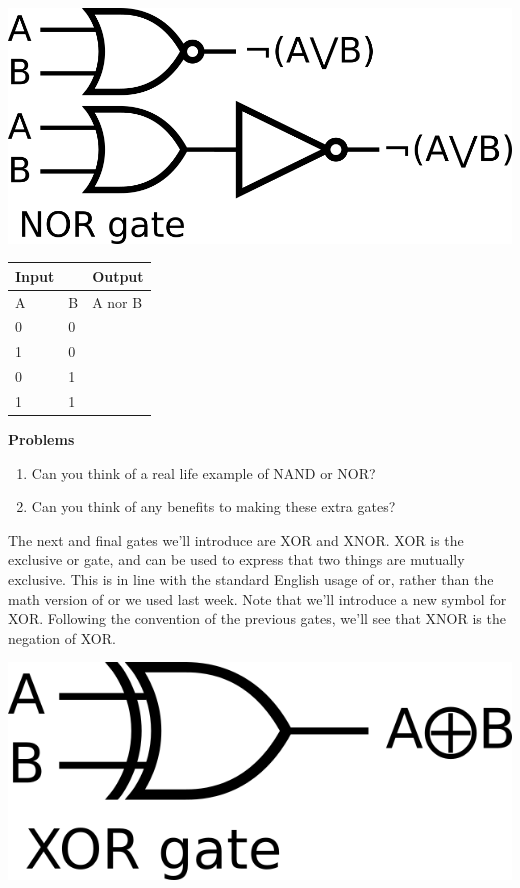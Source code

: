 \begin{minipage}{.5\linewidth}
    \includegraphics[width=3 in]{images/nor_diagram.png}
\end{minipage}
\begin{minipage}{\linewidth}
    \begin{tabular}{|ll|l|}
        \hline
        Input                   &   & Output  \\ \hline
        \multicolumn{1}{|l|}{A} & B & A nor B \\ \hline
        \multicolumn{1}{|l|}{0} & 0 &        \\ \hline
        \multicolumn{1}{|l|}{1} & 0 &        \\ \hline
        \multicolumn{1}{|l|}{0} & 1 &        \\ \hline
        \multicolumn{1}{|l|}{1} & 1 &        \\ \hline
    \end{tabular}
\end{minipage}
\begin{center}
    \textbf{Problems}
\end{center}
\begin{enumerate}
    \item Can you think of a real life example of NAND or NOR?
    \vspace{2in}
    \item Can you think of any benefits to making these extra gates?
    \vspace{2in}
\end{enumerate}
\newpage
The next and final gates we'll introduce are XOR and XNOR. XOR is the exclusive or gate, and can be
used to express that two things are mutually exclusive. This is in line with the standard English
usage of or, rather than the math version of or we used last week. Note that we'll introduce
a new symbol for XOR. Following the convention of the previous gates, we'll see that XNOR is the negation
of XOR.\\
\vspace{20mm}
\hspace{1in}
\begin{minipage}{.5\linewidth}
    \includegraphics[width=3 in]{images/xor_diagram.png}
\end{minipage}

